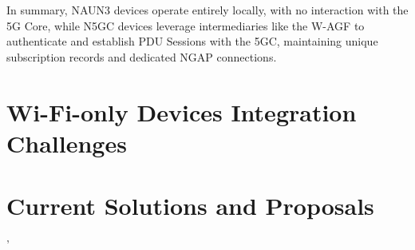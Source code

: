 In summary, NAUN3 devices operate entirely locally, with no interaction with the 5G Core, while N5GC devices leverage intermediaries like the W-AGF to authenticate and establish PDU Sessions with the 5GC, maintaining unique subscription records and dedicated NGAP connections.


\section{Wi-Fi-only Devices Integration Challenges}

\section{Current Solutions and Proposals}'